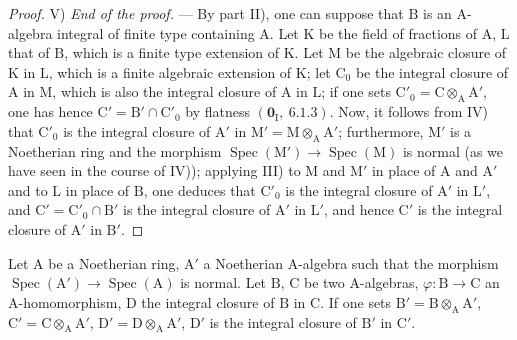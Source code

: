\begin{proof}

V) \emph{End of the proof.} --- By part II), one can suppose that $\mathrm{B}$ is an $\mathrm{A}$-algebra
integral of finite type containing $\mathrm{A}$. Let $\mathrm{K}$ be the field of fractions of $\mathrm{A}$, $\mathrm{L}$ that of $\mathrm{B}$, which
is a finite type extension of $\mathrm{K}$. Let $\mathrm{M}$ be the algebraic closure of $\mathrm{K}$ in $\mathrm{L}$, which
is a finite algebraic extension of $\mathrm{K}$; let $\mathrm{C}_0$ be the integral closure of $\mathrm{A}$ in $\mathrm{M}$,
which is also the integral closure of $\mathrm{A}$ in $\mathrm{L}$; if one sets
$\mathrm{C}'_0=\mathrm{C}\otimes_\mathrm{A}\mathrm{A}'$, one has hence $\mathrm{C}'=\mathrm{B}'\cap\mathrm{C}'_0$ by flatness $(\mathbf{0}_\mathrm{I},~6.1.3)$. Now, it follows from IV)
that $\mathrm{C}'_0$ is the integral closure of $\mathrm{A}'$ in $\mathrm{M}'=\mathrm{M}\otimes_\mathrm{A}\mathrm{A}'$; furthermore, $\mathrm{M}'$ is a Noetherian
ring and the morphism $\operatorname{Spec}(\mathrm{M}')\to\operatorname{Spec}(\mathrm{M})$ is normal (as we have seen in the
course of IV)); applying III) to $\mathrm{M}$ and $\mathrm{M}'$ in place of $\mathrm{A}$ and $\mathrm{A}'$ and to $\mathrm{L}$ in place of $\mathrm{B}$, one deduces
that $\mathrm{C}'_0$ is the integral closure of $\mathrm{A}'$ in $\mathrm{L}'$, and $\mathrm{C}'=\mathrm{C}'_0\cap\mathrm{B}'$ is the integral
closure of $\mathrm{A}'$ in $\mathrm{L}'$, and hence $\mathrm{C}'$ is the integral closure of $\mathrm{A}'$ in $\mathrm{B}'$.
\end{proof}

\begin{corollary}[6.14.5]
\label{IV.6.14.5}
Let $\mathrm{A}$ be a Noetherian ring, $\mathrm{A}'$ a Noetherian $\mathrm{A}$-algebra
such that the morphism $\operatorname{Spec}(\mathrm{A}')\to\operatorname{Spec}(\mathrm{A})$ is normal. Let $\mathrm{B}$, $\mathrm{C}$ be two $\mathrm{A}$-algebras, $\varphi:\mathrm{B}\to\mathrm{C}$
an $\mathrm{A}$-homomorphism, $\mathrm{D}$ the integral closure of $\mathrm{B}$ in $\mathrm{C}$. If one
sets $\mathrm{B}'=\mathrm{B}\otimes_\mathrm{A}\mathrm{A}'$, $\mathrm{C}'=\mathrm{C}\otimes_\mathrm{A}\mathrm{A}'$, $\mathrm{D}'=\mathrm{D}\otimes_\mathrm{A}\mathrm{A}'$, $\mathrm{D}'$ is the integral closure of $\mathrm{B}'$ in $\mathrm{C}'$.
\end{corollary}

